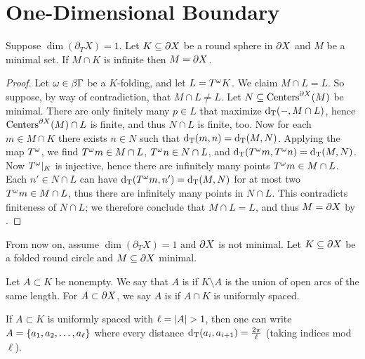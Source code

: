 \documentclass{amsart}
\newcommand{\bdT}{\partial_T}
\begin{document}
\section{One-Dimensional Boundary}


\begin{lemma}			\label{infinite case}
Suppose $\dim(\bdT X) = 1$.  Let $K \subseteq \partial X$ be a round sphere in $\partial X$ and $M$ be a minimal set.  If $M \cap K$ is infinite then $M = \partial X$. \end{lemma}

\begin{proof}
Let $\omega \in \beta \Gamma$ be a $K$-folding, and let $L = T^{\omega} K$.
We claim $M \cap L = L$.
So suppose, by way of contradiction, that $M \cap L \neq L$.
Let $N \subseteq \operatorname{Centers}^{\partial X} (M)$ be minimal.
There are only finitely many $p \in L$ that maximize $\operatorname{d_T}(-, M \cap L)$, hence $\operatorname{Centers}^{\partial X} (M) \cap L$ is finite, and thus $N \cap L$ is finite, too.
Now for each $m \in M \cap K$ there exists $n \in N$ such that $\operatorname{d_T}(m, n) = \operatorname{d_T}(M, N)$.  Applying the map $T^{\omega}$, we find $T^{\omega} m \in M \cap L$, $T^{\omega} n \in N \cap L$, and $\operatorname{d_T}(T^{\omega} m, T^{\omega} n) = \operatorname{d_T}(M, N)$.
Now $T^{\omega} \vert_{K}$ is injective, hence there are infinitely many points $T^{\omega} m \in M \cap L$.
Each $n' \in N \cap L$ can have $\operatorname{d_T}(T^{\omega} m, n') = \operatorname{d_T}(M, N)$ for at most two $T^{\omega} m \in M \cap L$, thus there are infinitely many points in $N \cap L$.
This contradicts finiteness of $N \cap L$; we therefore conclude that $M \cap L = L$, and thus $M = \partial X$ by .
\end{proof}

\begin{standing hypothesis}
From now on, assume $\dim(\bdT X) = 1$ and $\partial X$ is not minimal.  Let $K \subseteq \partial X$ be a folded round circle and $M \subseteq \partial X$ minimal.
\end{standing hypothesis}

\begin{definition}
Let $A \subset K$ be nonempty.  We say that $A$ is  if $K \setminus A$ is the union of open arcs of the same length.  For $A \subset \partial X$, we say $A$ is  if $A \cap K$ is uniformly spaced. \end{definition}

\begin{remark}
If $A \subset K$ is uniformly spaced with $\ell = \left| A \right| > 1$, then one can write $A = \left\{a_1, a_2, \dotsc, a_\ell\right\}$ where every distance $\operatorname{d_T}(a_i, a_{i+1}) = \frac{2\pi}{\ell}$ (taking indices mod $\ell$). \end{remark}
\end{document}
